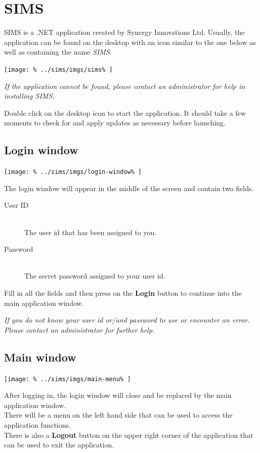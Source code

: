 \documentclass[../main/main]{subfiles}
\begin{document}
\newpage
\chapter{SIMS}

SIMS is a .NET application created by Synergy Innovations Ltd.
Usually, the application can be found on the desktop with an icon
similar to the one below as well as containing the name \emph{SIMS}.

\texttt{[image: \%
  ../sims/imgs/sims\%
]}

\emph{If the application cannot be found, please contact an
  administrator for help in installing SIMS.}

Double click on the desktop icon to start the application. It should
take a few moments to check for and apply updates as necessary
before launching.

\section{Login window}

\texttt{[image: \%
  ../sims/imgs/login-window\%
]}

The login window will appear in the middle of the screen and contain
two fields.
\begin{description}
\item[User ID] \hfill \\
  The user id that has been assigned to you.
\item[Password] \hfill \\
  The secret password assigned to your user id.
\end{description}

Fill in all the fields and then press on the \textbf{Login} button
to continue into the main application window.

\emph{If you do not know your user id or/and password to use or encounter an
error. Please contact an administrator for further help.}

\section{Main window}

\texttt{[image: \%
  ../sims/imgs/main-menu\%
]}

After logging in, the login window will close and be replaced by
the main application window.\\
There will be a menu on the left hand side that can be used to access
the application functions.\\
There is also a \textbf{Logout} button on the upper right corner of
the application that can be used to exit the application.
\end{document}
